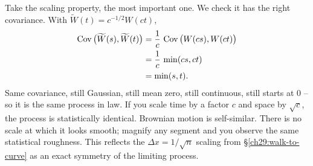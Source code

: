 \begin{whybox}
Take the scaling property, the most important one. We check it has the right
covariance. With $\widetilde W(t) = c^{-1/2}W(ct)$,
\begin{align*}
  \operatorname{Cov}\big(\widetilde W(s),\widetilde W(t)\big)
  &= \frac{1}{c}\,\operatorname{Cov}\big(W(cs),W(ct)\big) \\
  &= \frac{1}{c}\,\min(cs,ct) \\
  &= \min(s,t).
\end{align*}
Same covariance, still Gaussian, still mean zero, still continuous, still starts
at $0$ -- so it is the same process in law. If you scale
time by a factor $c$ and space by $\sqrt c$, the process is statistically
identical. Brownian motion is self-similar. There is no scale at which it
looks smooth; magnify any segment and you observe the same statistical roughness.
This reflects the $\Delta x = 1/\sqrt n$ scaling from \S\ref{ch29:walk-to-curve}
as an exact symmetry of the limiting process.


\end{whybox}
